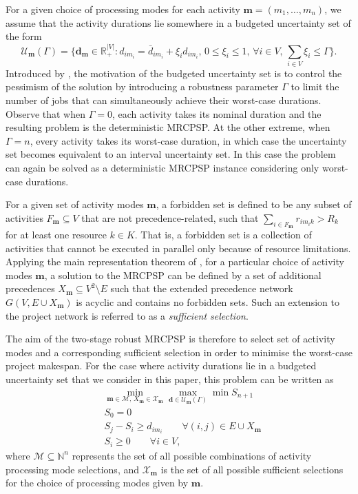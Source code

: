 \documentclass[a4paper,abstracton]{scrartcl}
\newcommand{\M}{{\mathcal{M}}}
\newcommand{\U}{{\mathcal{U}}}
\newcommand{\X}{{\mathcal{X}}}
\begin{document}
For a given choice of processing modes for each activity $\bm{m}=(m_1,\dots,m_n)$, we assume that the activity durations lie somewhere in a budgeted uncertainty set of the form
$$\U_{\bm{m}}(\Gamma)=\Bigg\{\bm{d}_{\bm{m}}\in\mathbb{R}_+^{|V|}:d_{im_i}=\bar{d}_{im_i}+\xi_i\hat{d}_{im_i},\,0\leq \xi_i \leq 1,\,\forall i\in V,\,\sum_{i\in V}\xi_i \leq \Gamma\Bigg\}.$$
Introduced by \cite{bertsimas2004price}, the motivation of the budgeted uncertainty set is to control the pessimism of the solution by introducing a robustness parameter $\Gamma$ to limit the number of jobs that can simultaneously achieve their worst-case durations. Observe that when $\Gamma=0$, each activity takes its nominal duration and the resulting problem is the deterministic MRCPSP. At the other extreme, when $\Gamma=n$, every activity takes its worst-case duration, in which case the uncertainty set becomes equivalent to an interval uncertainty set. In this case the problem can again be solved as a deterministic MRCPSP instance considering only worst-case durations.

For a given set of activity modes $\bm{m}$, a forbidden set is defined to be any subset of activities $F_{\bm{m}}\subseteq V$ that are not precedence-related, such that $\sum_{i\in F_{\bm{m}}}r_{im_ik}>R_k$ for at least one resource $k\in K$. That is, a forbidden set is a collection of activities that cannot be executed in parallel only because of resource limitations. Applying the main representation theorem of \cite{bartusch1988scheduling}, for a particular choice of activity modes $\bm{m}$, a solution to the MRCPSP can be defined by a set of additional precedences $X_{\bm{m}}\subseteq V^2\setminus E$ such that the extended precedence network $G(V,E\cup X_{\bm{m}})$ is acyclic and contains no forbidden sets. Such an extension to the project network is referred to as a \textit{sufficient selection}.

The aim of the two-stage robust MRCPSP is therefore to select set of activity modes and a corresponding sufficient selection in order to minimise the worst-case project makespan. For the case where activity durations lie in a budgeted uncertainty set that we consider in this paper, this problem can be written as
\begin{align}
	& \min_{\bm{m}\in \M,\,X_{\bm{m}}\in \X_{\bm{m}}} \max_{\bm{d}\in\U_{\bm{m}}(\Gamma)} \min S_{n+1}\label{eqn:robust_mrcpsp_1}\\
	& S_0 = 0\\
	& S_j - S_i \geq d_{im_i} \qquad \forall (i,j)\in E\cup X_{\bm{m}}\\
	& S_i \geq 0 \qquad \forall i\in V,\label{eqn:robust_mrcpsp_4}
\end{align}
where $\M\subseteq \mathbb{N}^n$ represents the set of all possible combinations of activity processing mode selections, and $\X_{\bm{m}}$ is the set of all possible sufficient selections for the choice of processing modes given by $\bm{m}$. 
\end{document}
